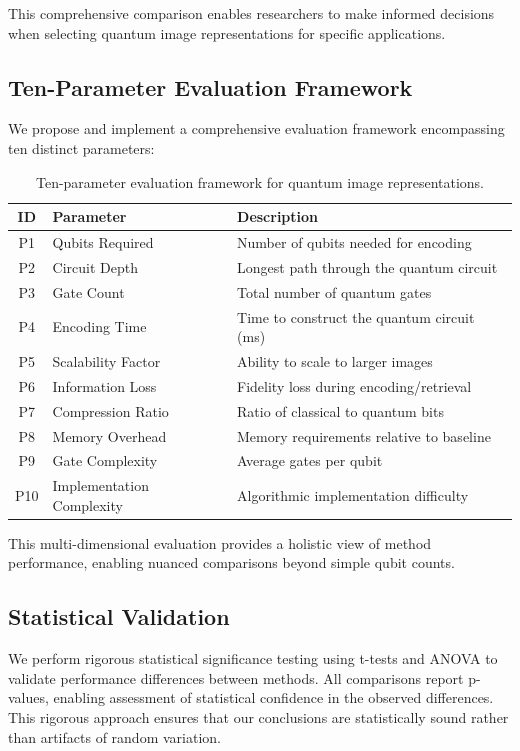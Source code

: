 \documentclass[pdflatex,sn-mathphys-num,Numbered]{sn-jnl}
\theoremstyle{thmstyleone}
\theoremstyle{thmstyletwo}
\theoremstyle{thmstylethree}
\begin{document}
This comprehensive comparison enables researchers to make informed decisions when selecting quantum image representations for specific applications.

\subsection{Ten-Parameter Evaluation Framework}

We propose and implement a comprehensive evaluation framework encompassing ten distinct parameters:

\begin{table}[h!]
\caption{Ten-parameter evaluation framework for quantum image representations.}
\label{tab:parameters}
\centering
\begin{tabular}{@{}clp{7cm}@{}}
\toprule
ID & Parameter & Description \\
\midrule
P1 & Qubits Required & Number of qubits needed for encoding \\
P2 & Circuit Depth & Longest path through the quantum circuit \\
P3 & Gate Count & Total number of quantum gates \\
P4 & Encoding Time & Time to construct the quantum circuit (ms) \\
P5 & Scalability Factor & Ability to scale to larger images \\
P6 & Information Loss & Fidelity loss during encoding/retrieval \\
P7 & Compression Ratio & Ratio of classical to quantum bits \\
P8 & Memory Overhead & Memory requirements relative to baseline \\
P9 & Gate Complexity & Average gates per qubit \\
P10 & Implementation Complexity & Algorithmic implementation difficulty \\
\bottomrule
\end{tabular}
\end{table}
\FloatBarrier

This multi-dimensional evaluation provides a holistic view of method performance, enabling nuanced comparisons beyond simple qubit counts.

\subsection{Statistical Validation}

We perform rigorous statistical significance testing using t-tests and ANOVA to validate performance differences between methods. All comparisons report p-values, enabling assessment of statistical confidence in the observed differences. This rigorous approach ensures that our conclusions are statistically sound rather than artifacts of random variation.
\end{document}
